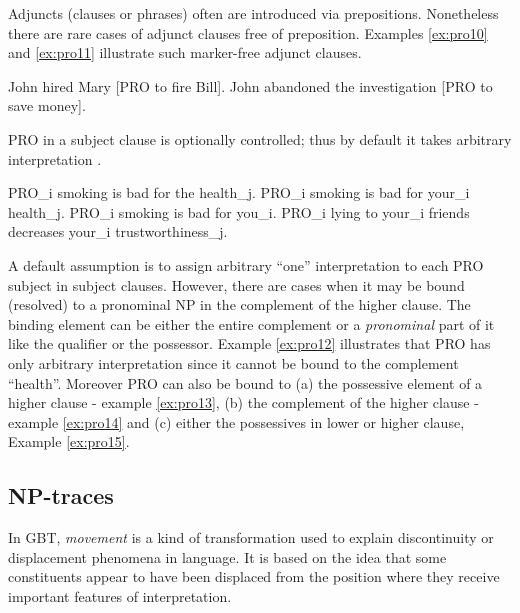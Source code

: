     Adjuncts (clauses or phrases) often are introduced via prepositions. Nonetheless there are rare cases of adjunct clauses free of preposition. Examples \ref{ex:pro10} and \ref{ex:pro11} illustrate such marker-free adjunct clauses.

    \begin{exe}
    	\ex\label{ex:pro10} John hired Mary [PRO to fire Bill].
    	\ex\label{ex:pro11} John abandoned the investigation [PRO to save money].
    \end{exe}

    \begin{generalization}\label{gen:9}
    	PRO in a subject clause is optionally controlled; thus by default it takes arbitrary interpretation \citep[283]{Haegeman1991}.  
    \end{generalization}

    \begin{exe}
        \ex\label{ex:pro12} PRO_i smoking is bad for the health_j.
        \ex\label{ex:pro13} PRO_i smoking is bad for your_i health_j.
        \ex\label{ex:pro14} PRO_i smoking is bad for you_i.
        \ex\label{ex:pro15} PRO_i lying to your_i friends decreases your_i trustworthiness_j.
    \end{exe}

    A default assumption is to assign arbitrary ``one'' interpretation to each PRO subject in subject clauses. However, there are cases when it may be bound (resolved) to a pronominal NP in the complement of the higher clause. The binding element can be either the entire complement or a \textit{pronominal} part of it like the qualifier or the possessor. Example \ref{ex:pro12} illustrates that PRO has only arbitrary interpretation since it cannot be bound to the complement ``health''. 
    Moreover PRO can also be bound to (a) the possessive element of a higher clause - example \ref{ex:pro13}, (b) the complement of the higher clause - example \ref{ex:pro14} and (c) either the possessives in lower or higher clause, Example \ref{ex:pro15}.

\subsection{NP-traces} 
\label{sec:np-gbt}

    In GBT, \textit{movement} is a kind of transformation used to explain discontinuity or displacement phenomena in language. It is based on the idea that some constituents appear to have been displaced from the position where they receive important features of interpretation. 

